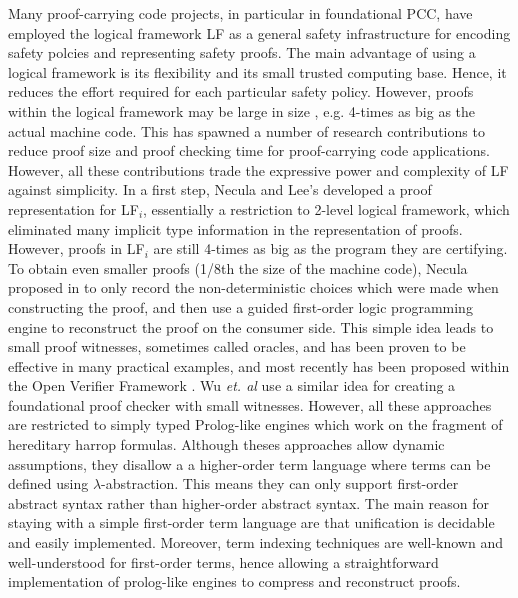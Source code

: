 \documentclass{acmconf}
\begin{document}
Many proof-carrying code projects, in particular in foundational PCC,
have employed the logical framework LF as a general safety
infrastructure for encoding safety polcies and representing safety
proofs\cite{AppelFelty00,Crary:POPL03,AppelFelten99,Crary:CADE03}.
The main advantage of using a logical framework is its flexibility
and its small trusted computing base. Hence, it reduces the effort
required for each particular safety policy. However, proofs within the
logical framework may be large in size 
, e.g. 4-times as big as the
actual machine code. This has spawned a number of research
contributions to reduce proof size and proof checking time for
proof-carrying code applications. However, all these contributions
trade the expressive power and complexity of LF against
simplicity. 
In a first step, Necula and Lee's \cite{Necula98lics} developed a
proof representation for LF$_i$, essentially a restriction to 2-level
logical framework, which eliminated many implicit type information in
the representation of proofs. However, proofs in LF$_i$ are still
4-times as big as the program they are certifying.
To obtain even smaller proofs (1/8th the size of the machine code),
Necula proposed in \cite{Necula+01:oracle} to only record the
non-deterministic choices which were made when constructing the proof,
and then use a guided first-order logic programming engine to
reconstruct the proof on the consumer side. This simple idea leads to
small proof witnesses, sometimes called oracles, and has been
proven to be effective in many practical examples, and most recently
has been proposed within the Open Verifier Framework \cite{Necula?}. Wu
{\em{et. al}} \cite{Appel:PPDP03} use a similar idea for creating a
foundational proof checker with small witnesses. However, all these
approaches are restricted to simply typed Prolog-like engines which
work on the fragment of hereditary harrop formulas. Although theses
approaches allow dynamic assumptions, they disallow a a higher-order
term language where terms can be defined using
$\lambda$-abstraction. This means they can only support first-order
abstract syntax rather than higher-order abstract syntax.  The main
reason for staying with a simple first-order term language are that
unification is decidable and easily implemented. Moreover, term
indexing techniques are well-known and well-understood for first-order
terms, hence allowing a straightforward implementation of prolog-like
engines to compress and reconstruct proofs. 
\end{document}
